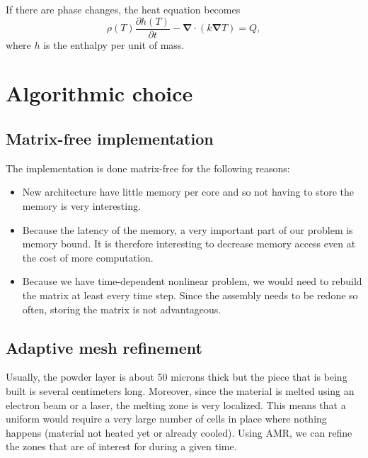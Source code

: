 \documentclass[letterpaper]{article}
\newcommand\bn{\boldsymbol{\nabla}}
\renewcommand{\(}{\left(}
\renewcommand{\)}{\right)}
\renewcommand{\[}{\left[}
\renewcommand{\]}{\right]}
\begin{document}
If there are phase changes, the heat equation becomes
\begin{equation}
  \rho(T) \frac{\partial h(T)}{\partial t} - \bn \cdot \(k\bn T\) = Q,
\end{equation}
where $h$ is the enthalpy per unit of mass.

\section{Algorithmic choice}
\subsection{Matrix-free implementation}
The implementation is done matrix-free for the following reasons:
\begin{itemize}
  \item New architecture have little memory per core and so not having to store
    the memory is very interesting.
  \item Because the latency of the memory, a very important part of our problem
    is memory bound. It is therefore interesting to decrease memory access even
    at the cost of more computation.
  \item Because we have time-dependent nonlinear problem, we would need to
    rebuild the matrix at least every time step. Since the assembly needs to be
    redone so often, storing the matrix is not advantageous.
\end{itemize}

\subsection{Adaptive mesh refinement}
Usually, the powder layer is about 50 microns thick but the piece that is being
built is several centimeters long. Moreover, since the material is melted using
an electron beam or a laser, the melting zone is very localized. This means that
a uniform would require a very large number of cells in place where nothing
happens (material not heated yet or already cooled). Using AMR, we can refine
the zones that are of interest for during a given time.
\end{document}
